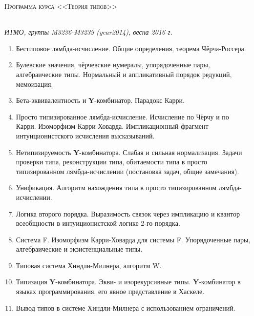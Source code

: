 \documentclass[12pt,a4paper,oneside]{book}
\begin{document}
\pagestyle{empty}

\begin{center}
\begin{Large}\scshape Программа курса <<Теория типов>>\end{Large}\\\vspace{0.1cm}
\textit{ИТМО, группы M3236-M3239 (year2014), весна 2016 г.}
\end{center}
\vspace{0.5cm}

\begin{enumerate}
\item Бестиповое лямбда-исчисление. Общие определения, теорема Чёрча-Россера.
\item Булевские значения, чёрчевские нумералы, упорядоченные пары, 
алгебраические типы. Нормальный и аппликативный порядок редукций, мемоизация.
\item Бета-эквивалентность и \textbf{Y}-комбинатор. Парадокс Карри.
\item Просто типизированное лямбда-исчисление. Исчисление по Чёрчу и по Карри.
Изоморфизм Карри-Ховарда. Импликационный фрагмент интуиционистского исчисления высказываний.
\item Нетипизируемость \textbf{Y}-комбинатора. Слабая и сильная нормализация. Задачи проверки типа, 
реконструкции типа, обитаемости типа в просто типизированном лямбда-исчислении
(постановка задач, общие замечания).
\item Унификация. Алгоритм нахождения типа в просто типизированном лямбда-исчислении.
\item Логика второго порядка. Выразимость связок через импликацию и квантор всеобщности в интуиционистской логике 2-го порядка.
\item Система F. Изоморфизм Карри-Ховарда для системы F. Упорядоченные пары, алгебраические и экзистенциальные типы.
\item Типовая система Хиндли-Милнера, алгоритм W.
\item Типизация \textbf{Y}-комбинатора. Экви- и изорекурсивные типы.
\textbf{Y}-комбинатор в языках программирования, его явное представление 
в Хаскеле.
\item Вывод типов в системе Хиндли-Милнера с использованием ограничений.

\end{enumerate}
\end{document}
